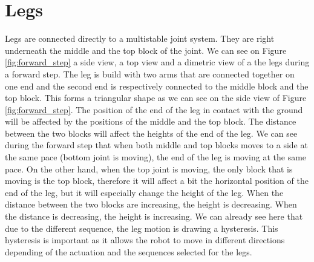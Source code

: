     \section{Legs}\label{sec:legs}
        Legs are connected directly to a multistable joint system. They are right underneath the middle and the top block of the joint. We can see on Figure \ref{fig:forward_step} a side view, a top view and a dimetric view of a the legs during a forward step. 
        The leg is build with two arms that are connected together on one end and the second end is respectively connected to the middle block and the top block. This forms a triangular shape as we can see on the side view of Figure \ref{fig:forward_step}. The position of the end of the leg in contact with the ground will be affected by the positions of the middle and the top block. The distance between the two blocks will affect the heights of the end of the leg. We can see during the forward step that when both middle and top blocks moves to a side at the same pace (bottom joint is moving), the end of the leg is moving at the same pace. On the other hand, when the top joint is moving, the only block that is moving is the top block, therefore it will affect a bit the horizontal position of the end of the leg, but it will especially change the height of the leg. When the distance between the two blocks are increasing, the height is decreasing. When the distance is decreasing, the height is increasing. We can already see here that due to the different sequence, the leg motion is drawing a hysteresis. This hysteresis is important as it allows the robot to move in different directions depending of the actuation and the sequences selected for the legs. 

